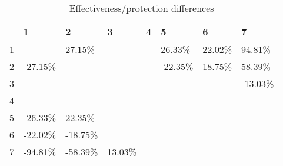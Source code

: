 \begin{table}[ht]
\centering
\begin{tabular}{rlllllll}
  \hline
 & 1 & 2 & 3 & 4 & 5 & 6 & 7 \\ 
  \hline
1 &  & 27.15\% &  &  & 26.33\% & 22.02\% & 94.81\% \\ 
  2 & -27.15\% &  &  &  & -22.35\% & 18.75\% & 58.39\% \\ 
  3 &  &  &  &  &  &  & -13.03\% \\ 
  4 &  &  &  &  &  &  &  \\ 
  5 & -26.33\% & 22.35\% &  &  &  &  &  \\ 
  6 & -22.02\% & -18.75\% &  &  &  &  &  \\ 
  7 & -94.81\% & -58.39\% & 13.03\% &  &  &  &  \\ 
   \hline
\end{tabular}
\caption{Effectiveness/protection differences} 
\end{table}
